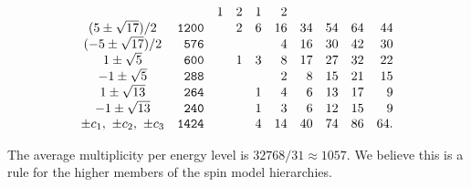 \documentclass[a4paper,12pt]{article}
\begin{document}
\begin{equation}
\begin{array}{crrrrrrrrr}
&               &       1       &       2       &       1       &       2
\\
 (5\pm\sqrt{17})/2      &       {\tt    1200    }       &               &
 2       &       6       &       16      &       34      &       54      &
 64      &       44      \\
 (-5\pm\sqrt{17})/2     &       {\tt    576     }       &               &
 &               &       4       &       16      &       30      &       42
 &       30      \\
 1\pm\sqrt{5}   &       {\tt    600     }       &               &       1
 &       3       &       8       &       17      &       27      &       32
 &       22      \\
 -1\pm\sqrt{5}  &       {\tt    288     }       &               &
 &               &       2       &       8       &       15      &       21
 &       15      \\
 1\pm\sqrt{13}  &       {\tt    264     }       &               &
 &       1       &       4       &       6       &       13      &       17
 &       9       \\
-1 \pm\sqrt{13} &       {\tt    240     }       &               &
&       1       &       3       &       6       &       12      &       15
&       9       \\
 \pm c_1,\ \pm c_2,\ \pm c_3    &       {\tt    1424    }       &
 &               &       4       &       14      &       40      &       74
 &       86      &       64.
\end{array}
\end{equation}

The average multiplicity per energy level is $32768/31\approx1057$.
We believe this is a rule for the higher members of the spin model
hierarchies.
\end{document}
